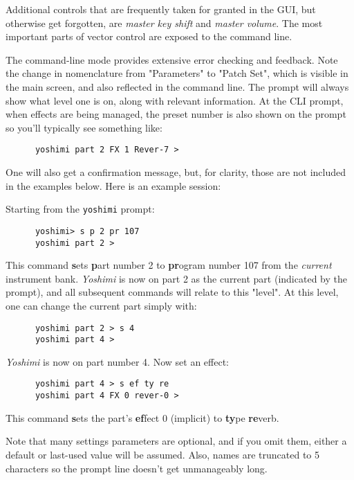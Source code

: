    Additional controls that are frequently taken for granted in the GUI, but
   otherwise get forgotten, are \textsl{master key shift} and \textsl{master
   volume}.  The most important parts of vector control are exposed to the
   command line.

   The command-line mode provides extensive error checking and feedback.
   Note the change in nomenclature from "Parameters" to "Patch Set", which is
   visible in the main screen, and also reflected in the command line.
   The prompt will always show what level
   one is on, along with relevant information.
   At the CLI prompt, when effects are being managed, the preset number is also
   shown on the prompt so you'll typically see something like:

   \begin{verbatim}
      yoshimi part 2 FX 1 Rever-7 >
   \end{verbatim}

   One will also get a confirmation message, but, for clarity,
   those are not included in the examples below.
   Here is an example session:

   Starting from the \texttt{yoshimi} prompt:

   \begin{verbatim}
      yoshimi> s p 2 pr 107
      yoshimi part 2 >
   \end{verbatim}

   This command \textbf{s}ets \textbf{p}art number 2 to \textbf{pr}ogram
   number 107 from the \textsl{current} instrument bank.
   \textsl{Yoshimi} is now on part 2 as the current part (indicated by the
   prompt), and all subsequent commands will relate to this "level".
   At this level, one can change the current part simply with:

   \begin{verbatim}
      yoshimi part 2 > s 4
      yoshimi part 4 >
   \end{verbatim}

   \textsl{Yoshimi} is now on part number 4. Now set an effect:

   \begin{verbatim}
      yoshimi part 4 > s ef ty re
      yoshimi part 4 FX 0 rever-0 >
   \end{verbatim}

   This command \textbf{s}ets the part's \textbf{ef}fect 0 (implicit) to
   \textbf{ty}pe \textbf{re}verb.

   Note that many settings parameters are optional, and if you omit them,
   either a default or last-used value will be assumed. Also, names are
   truncated to 5 characters so the prompt line doesn't get unmanageably long.

